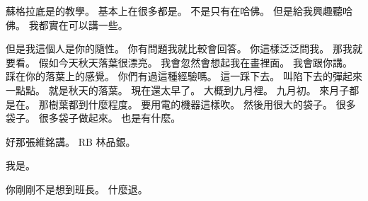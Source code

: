 \hypertarget{c01:cue:2365}{}蘇格拉底是的教學。
\hypertarget{c01:cue:2366}{}基本上在很多都是。
\hypertarget{c01:cue:2367}{}不是只有在哈佛。
\hypertarget{c01:cue:2368}{}但是給我興趣聽哈佛。
\hypertarget{c01:cue:2369}{}我都實在可以講一些。

\hypertarget{c01:cue:2370}{}但是我這個人是你的隨性。
\hypertarget{c01:cue:2371}{}你有問題我就比較會回答。
\hypertarget{c01:cue:2372}{}你這樣泛泛問我。
\hypertarget{c01:cue:2373}{}那我就要看。
\hypertarget{c01:cue:2374}{}假如今天秋天落葉很漂亮。
\hypertarget{c01:cue:2375}{}我會忽然會想起我在畫裡面。
\hypertarget{c01:cue:2376}{}我會跟你講。
\hypertarget{c01:cue:2377}{}踩在你的落葉上的感覺。
\hypertarget{c01:cue:2378}{}你們有過這種經驗嗎。
\hypertarget{c01:cue:2379}{}這一踩下去。
\hypertarget{c01:cue:2380}{}叫陷下去的彈起來一點點。
\hypertarget{c01:cue:2381}{}就是秋天的落葉。
\hypertarget{c01:cue:2382}{}現在還太早了。
\hypertarget{c01:cue:2383}{}大概到九月裡。
\hypertarget{c01:cue:2384}{}九月初。
\hypertarget{c01:cue:2385}{}來月子都是在。
\hypertarget{c01:cue:2386}{}那樹葉都到什麼程度。
\hypertarget{c01:cue:2387}{}要用電的機器這樣吹。
\hypertarget{c01:cue:2388}{}然後用很大的袋子。
\hypertarget{c01:cue:2389}{}很多袋子。
\hypertarget{c01:cue:2390}{}很多袋子做起來。
\hypertarget{c01:cue:2391}{}也是有什麼。

\hypertarget{c01:cue:2392}{}好那張維銘講。
\hypertarget{c01:cue:2393}{}RB 林品銀。

\hypertarget{c01:cue:2394}{}我是。

\hypertarget{c01:cue:2395}{}你剛剛不是想到班長。
\hypertarget{c01:cue:2396}{}什麼退。

